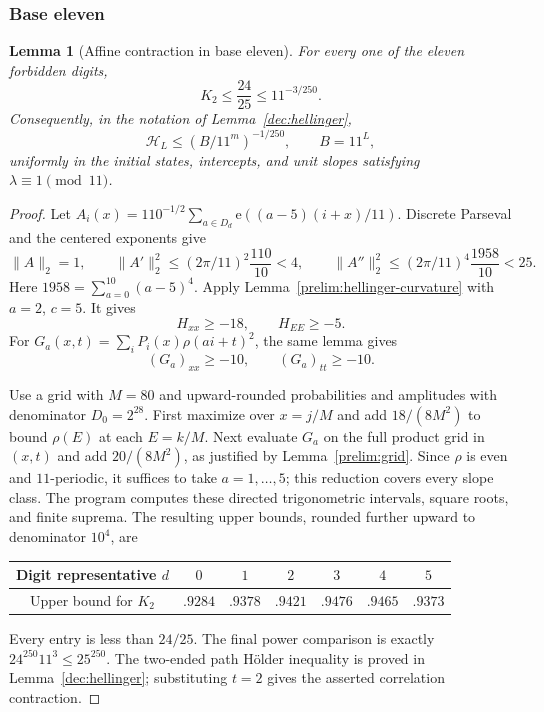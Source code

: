 \documentclass[11pt,a4paper]{article}
\theoremstyle{paperplain}
\newtheorem{lemma}[theorem]{Lemma}
\numberwithin{equation}{section}
\begin{document}
\subsubsection{Base eleven}

\begin{lemma}[Affine contraction in base eleven]\label{eleven:hellinger}
For every one of the eleven forbidden digits,
\begin{equation}\label{eleven:K2}
 K_2\leqslant\frac{24}{25}\leqslant11^{-3/250}.
\end{equation}
Consequently, in the notation of Lemma~\ref{dec:hellinger},
\[
 \mathcal H_L\leqslant(B/11^m)^{-1/250},\qquad B=11^L,
\]
uniformly in the initial states, intercepts, and unit slopes satisfying
$\lambda\equiv1\pmod {11}$.
\end{lemma}
\begin{proof}
Let
$A_i(x)=110^{-1/2}\sum_{a\in D_d}\mathrm e((a-5)(i+x)/11)$.
Discrete Parseval and the centered exponents give
\[
 \|A\|_2=1,\qquad
 \|A'\|_2^2\leqslant(2\pi/11)^2\frac{110}{10}<4,
 \qquad
 \|A''\|_2^2\leqslant(2\pi/11)^4\frac{1958}{10}<25.
\]
Here $1958=\sum_{a=0}^{10}(a-5)^4$. Apply
Lemma~\ref{prelim:hellinger-curvature} with $a=2$, $c=5$. It gives
\[
 H_{xx}\geqslant-18,\qquad H_{EE}\geqslant-5.
\]
For $G_a(x,t)=\sum_iP_i(x)\rho(ai+t)^2$, the same lemma gives
\[
 (G_a)_{xx}\geqslant-10,\qquad (G_a)_{tt}\geqslant-10.
\]

Use a grid with $M=80$ and upward-rounded probabilities and amplitudes
with denominator $D_0=2^{28}$. First maximize over $x=j/M$ and add
$18/(8M^2)$ to bound $\rho(E)$ at each $E=k/M$. Next evaluate $G_a$ on the
full product grid in $(x,t)$ and add $20/(8M^2)$, as justified by
Lemma~\ref{prelim:grid}. Since $\rho$ is even
and $11$-periodic, it suffices to take $a=1,\ldots,5$; this reduction covers
every slope class. The program 
computes these directed trigonometric intervals, square roots, and finite
suprema. The resulting upper bounds,
rounded further upward to denominator $10^4$, are
\begin{center}
\begin{tabular}{ccccccc}
\toprule
Digit representative $d$ & $0$ & $1$ & $2$ & $3$ & $4$ & $5$\\
\midrule
Upper bound for $K_2$ & $.9284$ & $.9378$ & $.9421$ & $.9476$ & $.9465$ & $.9373$\\
\bottomrule
\end{tabular}
\end{center}
Every entry is less than $24/25$. The final power comparison is exactly
$24^{250}11^3\leqslant25^{250}$. The two-ended path H\"older inequality is
proved in Lemma~\ref{dec:hellinger}; substituting $t=2$ gives the asserted
correlation contraction.
\end{proof}
\end{document}
